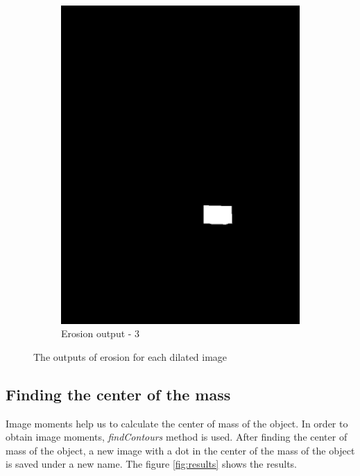 \documentclass[paper=a4, fontsize=10pt]{scrartcl} %
\numberwithin{equation}{section} %
\numberwithin{figure}{section} %
\begin{document}
\begin{figure}[!ht]
\begin{subfigure}[b]{0.275\textwidth}
		\includegraphics[width=\textwidth]{erosion_03}
		\caption{Erosion output - 3}
		\label{fig:erosiont_03}
	\end{subfigure}
	\caption{The outputs of erosion for each dilated image}
	\label{fig:erosion}
\end{figure}

\subsection{Finding the center of the mass}
Image moments help us to calculate the center of mass of the object. In order to obtain image moments, \textit{findContours} method is used. After finding the center of mass of the object, a new image with a dot in the center of the mass of the object is saved under a new name. The figure \ref{fig:results} shows the results.
\end{document}
